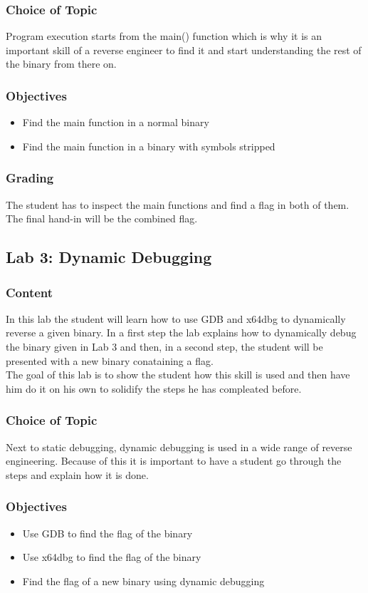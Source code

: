 \subsubsection*{Choice of Topic}
Program execution starts from the main() function which is why it is an important skill of a reverse engineer to find it and start understanding the rest of the binary from there on.
\subsubsection*{Objectives}
\begin{itemize}
    \item Find the main function in a normal binary
    \item Find the main function in a binary with symbols stripped
\end{itemize}
\subsubsection*{Grading}
The student has to inspect the main functions and find a flag in both of them. The final hand-in will be the combined flag.


\subsection{Lab 3: Dynamic Debugging}
\subsubsection*{Content}
In this lab the student will learn how to use GDB and x64dbg to dynamically reverse a given binary. In a first step the lab explains how to dynamically debug the binary given in Lab 3 and then, in a second step, the student will be presented with a new binary conataining a flag. \\
The goal of this lab is to show the student how this skill is used and then have him do it on his own to solidify the steps he has compleated before.
\subsubsection*{Choice of Topic}
Next to static debugging, dynamic debugging is used in a wide range of reverse engineering. Because of this it is important to have a student go through the steps and explain how it is done. 
\subsubsection*{Objectives}
\begin{itemize}
    \item Use GDB to find the flag of the binary
    \item Use x64dbg to find the flag of the binary
    \item Find the flag of a new binary using dynamic debugging
\end{itemize}
